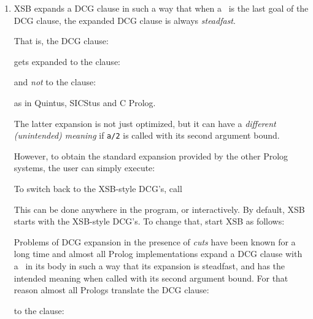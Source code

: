 \begin{enumerate}
\item XSB expands a DCG clause in such a way that when a \cut\ is 
      the last goal of the DCG clause, the expanded DCG clause is always 
      {\em steadfast}.

      That is, the DCG clause:


      \noindent
      gets expanded to the clause:


      \noindent
      and {\em not\/} to the clause:


      \noindent
      as in Quintus, SICStus and C Prolog.

      The latter expansion is not just optimized, but it can have a
      {\em different (unintended) meaning} if {\tt a/2} is called with
      its second argument bound.

      However, to obtain the standard expansion provided by the other Prolog
      systems, the user can simply execute:
      
    
      To switch back to the XSB-style DCG's, call
      

      This can be done anywhere in the program, or interactively.
      By default, XSB starts with the XSB-style DCG's. To change that,
      start XSB as follows:


      Problems of DCG expansion in the presence of {\em cuts} have been known
      for a long time and almost all Prolog implementations expand a DCG
      clause with a \cut\ in its body in such a way that its expansion is
      steadfast, and has the intended meaning when called with its second
      argument bound.  For that reason almost all Prologs translate the DCG
      clause:


      \noindent
      to the clause:


\end{enumerate}
